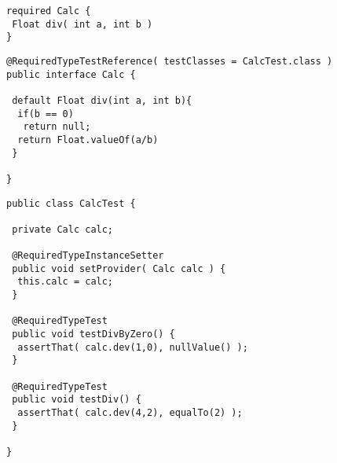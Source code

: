 \newpage
\begin{lstlisting}[caption={Required Typ \emph{Calc}},captionpos=b, style = dsl, label=lst_calc]
required Calc {
 Float div( int a, int b )	
}
\end{lstlisting}
\begin{lstlisting}[style = java, caption = Interface Calc, captionpos = b, label = lst_interface_calc]
@RequiredTypeTestReference( testClasses = CalcTest.class )
public interface Calc {

 default Float div(int a, int b){
  if(b == 0)
   return null;
  return Float.valueOf(a/b)
 }
 
}
\end{lstlisting}
\begin{lstlisting}[style = java, caption = Test CalcTest, captionpos = b, label = lst_testklasse_calc]
public class CalcTest {

 private Calc calc;
  
 @RequiredTypeInstanceSetter
 public void setProvider( Calc calc ) {
  this.calc = calc;
 }

 @RequiredTypeTest
 public void testDivByZero() {
  assertThat( calc.dev(1,0), nullValue() );
 }
  
 @RequiredTypeTest
 public void testDiv() {
  assertThat( calc.dev(4,2), equalTo(2) );
 }

}
\end{lstlisting}
\noindent
